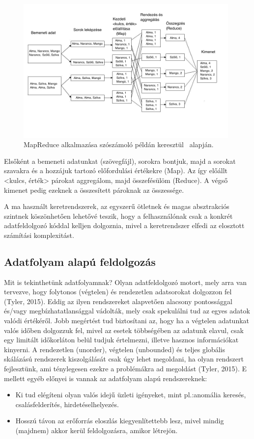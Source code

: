 \documentclass[a4paper,12pt]{article}
\begin{document}
\begin{figure}[ht!]
\centering
\includegraphics[width=110mm]{img/wordcountflow.jpg}
\caption{MapReduce alkalmazása szószámoló példán keresztül~\cite{hapreduce} alapján.
\label{wordcountflow}}
\end{figure}

Elsőként a bemeneti adatunkat (szövegfájl), sorokra bontjuk, majd a sorokat szavakra és a hozzájuk tartozó előfordulási értékekre (Map). Az így előállt <kulcs, érték> párokat aggregálom, majd összefésülöm (Reduce). A végső kimenet pedig ezeknek a összesített pároknak az összessége.

A ma használt keretrendszerek, az egyszerű ötletnek és magas absztrakciós szintnek köszönhetően lehetővé teszik, hogy a felhasználónak csak a konkrét adatfeldolgozó kóddal kelljen dolgoznia, mivel a keretrendszer elfedi az elosztott számítási komplexitást.~\cite{hadoop}

\subsection{Adatfolyam alapú feldolgozás}
Mit is tekinthetünk adatfolyamnak? Olyan adatfeldolgozó motort, mely arra van tervezve, hogy folytonos (végtelen) és rendezetlen adatsorokat dolgozzon fel (Tyler, 2015). Eddig az ilyen rendszereket alapvetően alacsony pontossággal és/vagy megbízhatatlansággal vádolták, mely csak spekulálni tud az egyes adatok valódi értékéről. Jobb megértést tud biztosítani az, hogy ha a végtelen adatunkat valós időben dolgozzuk fel, mivel az esetek többségében az adatunk elavul, csak egy limitált időkorláton belül tudjuk értelmezni, illetve hasznos információkat kinyerni. \newline
A rendezetlen (unorder), végtelen (unbounded) és teljes globális skálázású rendszerek kiszolgálását csak úgy lehet megoldani, ha olyan rendszert fejlesztünk, ami ténylegesen ezekre a problémákra ad megoldást (Tyler, 2015). E mellett egyéb előnyei is vannak az adatfolyam alapú rendszereknek: 
\begin{itemize}
\item Ki tud elégíteni olyan valós idejű üzleti igényeket, mint pl.:anomália keresés, csalásfelderítés, hirdetéselhelyezés.
\item Hosszú távon az erőforrás eloszlás kiegyenlítettebb lesz, mivel mindig (majdnem) akkor kerül feldolgozásra, amikor létrejön.
\end{itemize}
\end{document}

